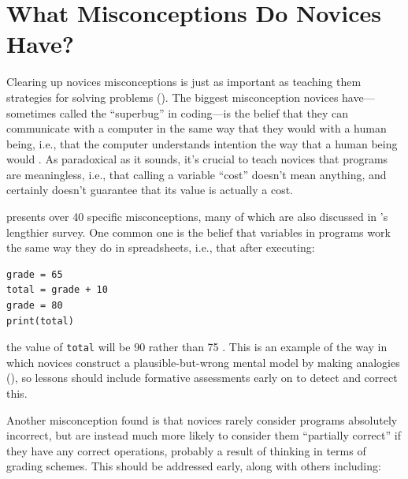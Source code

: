 \section{What Misconceptions Do Novices Have?}\label{s:pck-misunderstand}

Clearing up novices misconceptions is just as important as teaching
them strategies for solving problems ().  The
biggest misconception novices have---sometimes called the ``superbug''
in coding---is the belief that they can communicate with a computer in
the same way that they would with a human being, i.e., that the
computer understands intention the way that a human being would
\cite{Pea1986}.  As paradoxical as it sounds, it's crucial to teach
novices that programs are meaningless, i.e., that calling a variable
``cost'' doesn't mean anything, and certainly doesn't guarantee that
its value is actually a cost.

\cite{Sorv2018} presents over 40 specific misconceptions, many of
which are also discussed in \cite{Qian2017}'s lengthier survey.  One
common one is the belief that variables in programs work the same way
they do in spreadsheets, i.e., that after executing:

\begin{verbatim}
grade = 65
total = grade + 10
grade = 80
print(total)
\end{verbatim}

\noindent
the value of \texttt{total} will be 90 rather than 75 \cite{Kohn2017}.
This is an example of the way in which novices construct a
plausible-but-wrong mental model by making analogies
(), so lessons should include formative assessments
early on to detect and correct this.

Another misconception \cite{Koli2008} found is that novices rarely
consider programs absolutely incorrect, but are instead much more
likely to consider them ``partially correct'' if they have any correct
operations, probably a result of thinking in terms of grading schemes.
This should be addressed early, along with others including:

